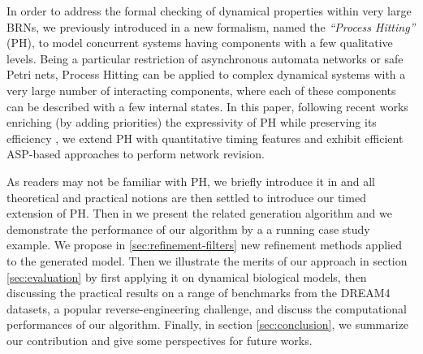 In order to address the formal checking of dynamical properties within very large BRNs, we previously introduced in \cite{PMR10-TCSB} a new formalism, named the \emph{``Process Hitting''} (PH), to model concurrent systems having components with a few qualitative levels. Being a particular restriction of asynchronous automata networks or safe Petri nets, Process Hitting can be applied to complex dynamical systems with a very large number of interacting components, where each of these components can be described with a few internal states. In this paper, following recent works enriching (by adding priorities) the expressivity of PH while preserving its efficiency \cite{folschette2013under}, we extend PH with quantitative timing features and exhibit efficient ASP-based approaches to perform network revision. 

As readers may not be familiar with PH, we briefly introduce it in  and all theoretical and practical notions are then settled to introduce our timed extension of PH. Then in   we present the related generation algorithm and we demonstrate the performance of our algorithm by a a running case study example. We propose in \ref{sec:refinement-filters} new refinement methods applied to the generated model. Then we illustrate the merits of our approach in section \ref{sec:evaluation} by first applying it on dynamical biological models, then discussing the practical results on a range of benchmarks from the DREAM4 datasets, a popular reverse-engineering challenge, and discuss the computational performances of our algorithm. Finally, in section \ref{sec:conclusion}, we summarize our contribution and give some perspectives for future works. 


